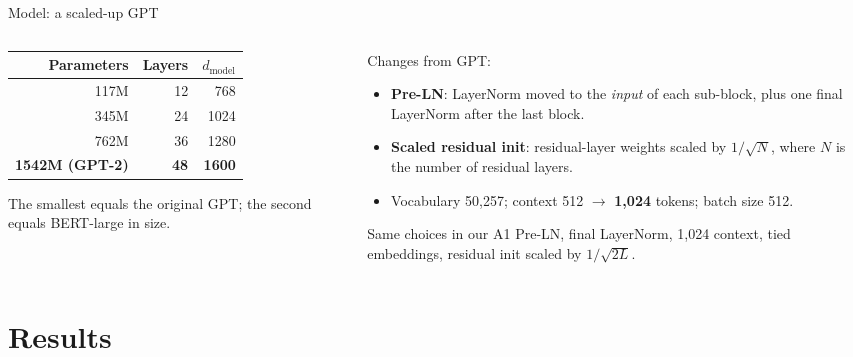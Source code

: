 \documentclass[aspectratio=169,11pt]{beamer}
\begin{document}
\begin{frame}{Model: a scaled-up GPT}
  \begin{columns}[T]
    \begin{column}{0.46\textwidth}
      \small
      \begin{tabular}{@{}rrr@{}}
        \toprule
        Parameters & Layers & $d_{\text{model}}$\\
        \midrule
        117M & 12 & 768\\
        345M & 24 & 1024\\
        762M & 36 & 1280\\
        \textbf{1542M (GPT-2)} & \textbf{48} & \textbf{1600}\\
        \bottomrule
      \end{tabular}
      \vspace{2mm}

      The smallest equals the original GPT; the second equals BERT-large in size.
    \end{column}
    \begin{column}{0.5\textwidth}
      \small
      Changes from GPT:
      \begin{itemize}
        \item \textbf{Pre-LN}: LayerNorm moved to the \emph{input} of each sub-block, plus one final LayerNorm after the last block.
        \item \textbf{Scaled residual init}: residual-layer weights scaled by $1/\sqrt{N}$, where $N$ is the number of residual layers.
        \item Vocabulary 50,257; context 512 $\to$ \textbf{1,024} tokens; batch size 512.
      \end{itemize}
      \begin{exampleblock}{Same choices in our A1}
        \small
        Pre-LN, final LayerNorm, 1,024 context, tied embeddings, residual init scaled by $1/\sqrt{2L}$.
      \end{exampleblock}
    \end{column}
  \end{columns}
\end{frame}

\section{Results}
\end{document}
